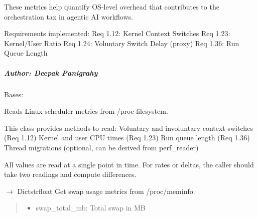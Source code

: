 \documentclass[letterpaper,10pt,english]{sphinxmanual}
\begin{document}
\sphinxAtStartPar
These metrics help quantify OS‑level overhead that contributes to the
orchestration tax in agentic AI workflows.

\sphinxAtStartPar
Requirements implemented:
\sphinxhyphen{} Req 1.12: Kernel Context Switches
\sphinxhyphen{} Req 1.23: Kernel/User Ratio
\sphinxhyphen{} Req 1.24: Voluntary Switch Delay (proxy)
\sphinxhyphen{} Req 1.36: Run Queue Length


\subparagraph{Author: Deepak Panigrahy}
\label{\detokenize{core.readers.scheduler_monitor:author-deepak-panigrahy}}

\begin{fulllineitems}
\label{\detokenize{core.readers.scheduler_monitor:core.readers.scheduler_monitor.SchedulerMonitor}}
\pysigstartsignatures
\pysiglinewithargsret
{}
{}
{}
\pysigstopsignatures
\sphinxAtStartPar
Bases: 

\sphinxAtStartPar
Reads Linux scheduler metrics from /proc filesystem.

\sphinxAtStartPar
This class provides methods to read:
\sphinxhyphen{} Voluntary and involuntary context switches (Req 1.12)
\sphinxhyphen{} Kernel and user CPU times (Req 1.23)
\sphinxhyphen{} Run queue length (Req 1.36)
\sphinxhyphen{} Thread migrations (optional, can be derived from perf\_reader)

\sphinxAtStartPar
All values are read at a single point in time. For rates or deltas,
the caller should take two readings and compute differences.

\begin{fulllineitems}
\label{\detokenize{core.readers.scheduler_monitor:core.readers.scheduler_monitor.SchedulerMonitor.get_swap_metrics}}
\pysigstartsignatures
\pysiglinewithargsret
{}
{}
{{ $\rightarrow$ Dict\DUrole{p}{{[}}strfloat\DUrole{p}{{]}}}}
\pysigstopsignatures
\sphinxAtStartPar
Get swap usage metrics from /proc/meminfo.
\begin{quote}\begin{description}
\sphinxAtStartPar
\begin{itemize}
\item {} 
\sphinxAtStartPar
swap\_total\_mb: Total swap in MB


\end{itemize}
\end{description}
\end{quote}
\end{fulllineitems}
\end{fulllineitems}
\end{document}
